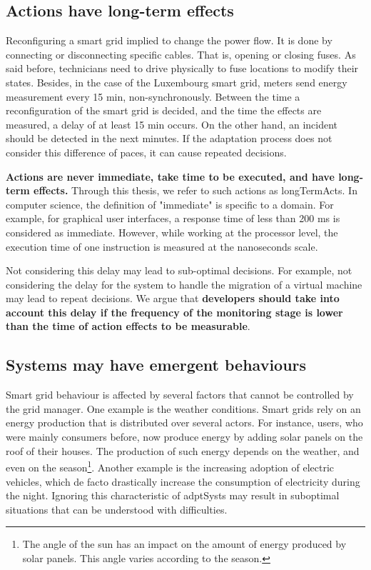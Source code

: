 \subsection{Actions have long-term effects}
Reconfiguring a smart grid implied to change the power flow.
It is done by connecting or disconnecting specific cables.
That is, opening or closing fuses.
As said before, technicians need to drive physically to fuse locations to modify their states.
Besides, in the case of the Luxembourg smart grid, meters send energy measurement every 15 min, non-synchronously.
Between the time a reconfiguration of the smart grid is decided, and the time the effects are measured, a delay of at least 15 min occurs.
On the other hand, an incident should be detected in the next minutes.
If the adaptation process does not consider this difference of paces, it can cause repeated decisions.

\textbf{Actions are never immediate, take time to be executed, and have long-term effects.}
Through this thesis, we refer to such actions as \glspl{longTermAct}.
In computer science, the definition of "immediate" is specific to a domain.
For example, for graphical user interfaces, a response time of less than 200 ms is considered as immediate.
However, while working at the processor level, the execution time of one instruction is measured at the nanoseconds scale.

Not considering this delay may lead to sub-optimal decisions.
For example, not considering the delay for the system to handle the migration of a virtual machine may lead to repeat decisions.
We argue that \textbf{developers should take into account this delay if the frequency of the monitoring stage is lower than the time of action effects to be measurable}.

\subsection{Systems may have emergent behaviours}
Smart grid behaviour is affected by several factors that cannot be controlled by the grid manager.
One example is the weather conditions.
Smart grids rely on an energy production that is distributed over several actors.
For instance, users, who were mainly consumers before, now produce energy by adding solar panels on the roof of their houses.
The production of such energy depends on the weather, and even on the season\footnote{The angle of the sun has an impact on the amount of energy produced by solar panels. This angle varies according to the season.}.
Another example is the increasing adoption of electric vehicles, which de facto drastically increase the consumption of electricity during the night.
Ignoring this characteristic of \glspl{adptSyst} may result in suboptimal situations that can be understood with difficulties.

